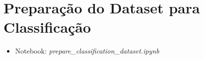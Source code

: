 \section{Preparação do Dataset para Classificação}

\begin{itemize}
	\item Notebook: \textit{prepare\_classification\_dataset.ipynb}
\end{itemize}

